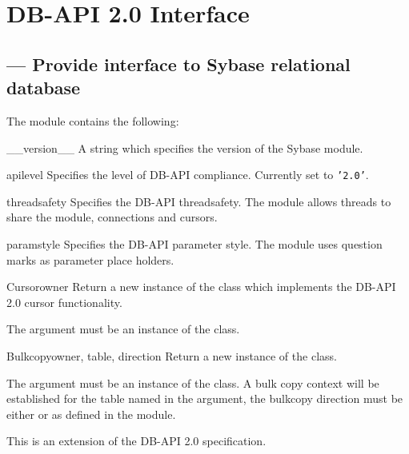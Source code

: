 \chapter{DB-API 2.0 Interface}

\localmoduletable

\section{ --- Provide interface to Sybase relational database}



The  module contains the following:

\begin{datadesc}{__version__}
A string which specifies the version of the Sybase module.
\end{datadesc}

\begin{datadesc}{apilevel}
Specifies the level of DB-API compliance.  Currently set to
\texttt{'2.0'}.
\end{datadesc}

\begin{datadesc}{threadsafety}
Specifies the DB-API threadsafety.  The  module allows
threads to share the module, connections and cursors.
\end{datadesc}

\begin{datadesc}{paramstyle}
Specifies the DB-API parameter style.  The  module uses
question marks as parameter place holders.
\end{datadesc}

\begin{classdesc}{Cursor}{owner}
Return a new instance of the  class which implements the
DB-API 2.0 cursor functionality.

The  argument must be an instance of the 
class.
\end{classdesc}

\begin{classdesc}{Bulkcopy}{owner, table, direction}
Return a new instance of the  class.

The  argument must be an instance of the 
class.  A bulk copy context will be established for the table named in
the  argument, the bulkcopy direction must be either
 or  as defined in the
 module.

This is an extension of the DB-API 2.0 specification.
\end{classdesc}

